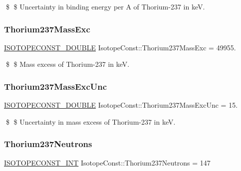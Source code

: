 \$ \$ Uncertainty in binding energy per A of Thorium-\/237 in keV. \mbox{\label{group___isotope_const-_thorium-_th237_ga22311d89bff603b88a4f6ce8c8190f82}} 
\subsubsection{\texorpdfstring{Thorium237\+Mass\+Exc}{Thorium237MassExc}}
{\footnotesize\ttfamily \mbox{\hyperlink{group___isotope_const-_macros_ga8f45a7272ce02c0b4c65c44636ed719a}{I\+S\+O\+T\+O\+P\+E\+C\+O\+N\+S\+T\+\_\+\+D\+O\+U\+B\+LE}} Isotope\+Const\+::\+Thorium237\+Mass\+Exc = 49955.}

\$ \$ Mass excess of Thorium-\/237 in keV. \mbox{\label{group___isotope_const-_thorium-_th237_ga3b8efcedb1d5115a5d8c84bbfb797f8a}} 
\subsubsection{\texorpdfstring{Thorium237\+Mass\+Exc\+Unc}{Thorium237MassExcUnc}}
{\footnotesize\ttfamily \mbox{\hyperlink{group___isotope_const-_macros_ga8f45a7272ce02c0b4c65c44636ed719a}{I\+S\+O\+T\+O\+P\+E\+C\+O\+N\+S\+T\+\_\+\+D\+O\+U\+B\+LE}} Isotope\+Const\+::\+Thorium237\+Mass\+Exc\+Unc = 15.}

\$ \$ Uncertainty in mass excess of Thorium-\/237 in keV. \mbox{\label{group___isotope_const-_thorium-_th237_gae7f2a05bb2d080819481b5b0d2c75015}} 
\subsubsection{\texorpdfstring{Thorium237\+Neutrons}{Thorium237Neutrons}}
{\footnotesize\ttfamily \mbox{\hyperlink{group___isotope_const-_macros_ga5f18360b3e99483a35c32d789e62621c}{I\+S\+O\+T\+O\+P\+E\+C\+O\+N\+S\+T\+\_\+\+I\+NT}} Isotope\+Const\+::\+Thorium237\+Neutrons = 147}

